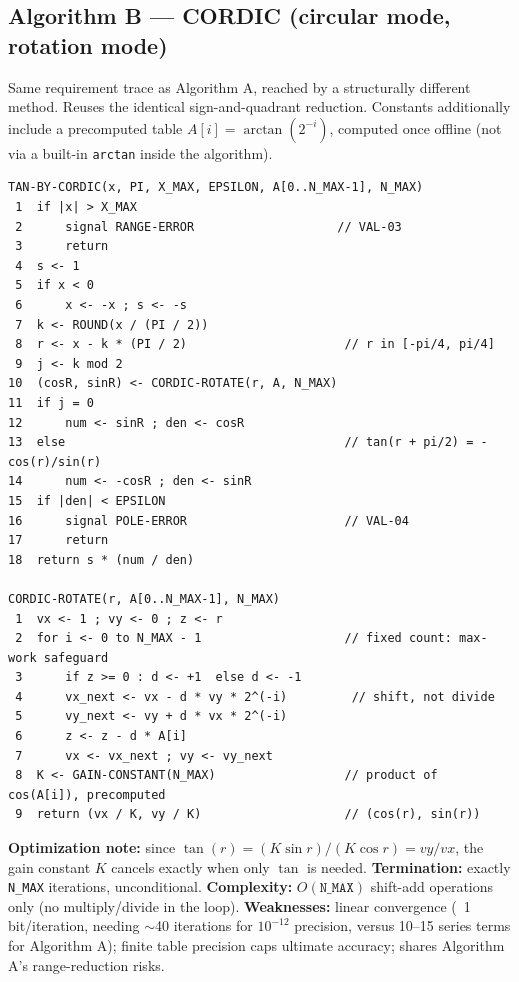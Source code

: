 \documentclass[11pt]{article}
\begin{document}
\subsection{Algorithm B --- CORDIC (circular mode, rotation mode)}

Same requirement trace as Algorithm A, reached by a structurally different method. Reuses the identical sign-and-quadrant reduction. Constants additionally include a precomputed table $A[i] = \arctan(2^{-i})$, computed once offline (not via a built-in \texttt{arctan} inside the algorithm).

\begin{lstlisting}[style=pseudo,caption={Algorithm B: TAN-BY-CORDIC},label={lst:algoB}]
TAN-BY-CORDIC(x, PI, X_MAX, EPSILON, A[0..N_MAX-1], N_MAX)
 1  if |x| > X_MAX
 2      signal RANGE-ERROR                    // VAL-03
 3      return
 4  s <- 1
 5  if x < 0
 6      x <- -x ; s <- -s
 7  k <- ROUND(x / (PI / 2))
 8  r <- x - k * (PI / 2)                      // r in [-pi/4, pi/4]
 9  j <- k mod 2
10  (cosR, sinR) <- CORDIC-ROTATE(r, A, N_MAX)
11  if j = 0
12      num <- sinR ; den <- cosR
13  else                                       // tan(r + pi/2) = -cos(r)/sin(r)
14      num <- -cosR ; den <- sinR
15  if |den| < EPSILON
16      signal POLE-ERROR                      // VAL-04
17      return
18  return s * (num / den)

CORDIC-ROTATE(r, A[0..N_MAX-1], N_MAX)
 1  vx <- 1 ; vy <- 0 ; z <- r
 2  for i <- 0 to N_MAX - 1                    // fixed count: max-work safeguard
 3      if z >= 0 : d <- +1  else d <- -1
 4      vx_next <- vx - d * vy * 2^(-i)         // shift, not divide
 5      vy_next <- vy + d * vx * 2^(-i)
 6      z <- z - d * A[i]
 7      vx <- vx_next ; vy <- vy_next
 8  K <- GAIN-CONSTANT(N_MAX)                  // product of cos(A[i]), precomputed
 9  return (vx / K, vy / K)                    // (cos(r), sin(r))
\end{lstlisting}

\textbf{Optimization note:} since $\tan(r) = (K\sin r)/(K\cos r) = vy/vx$, the gain constant $K$ cancels exactly when only $\tan$ is needed. \textbf{Termination:} exactly \texttt{N\_MAX} iterations, unconditional. \textbf{Complexity:} $O(\texttt{N\_MAX})$ shift-add operations only (no multiply/divide in the loop). \textbf{Weaknesses:} linear convergence (~1 bit/iteration, needing $\sim$40 iterations for $10^{-12}$ precision, versus 10--15 series terms for Algorithm A); finite table precision caps ultimate accuracy; shares Algorithm A's range-reduction risks.
\end{document}
